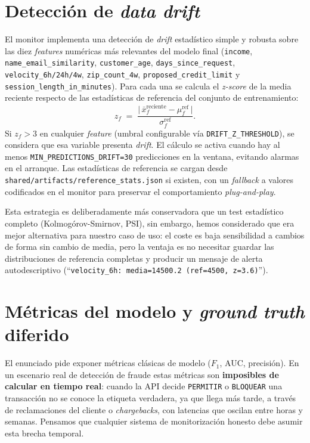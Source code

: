 \documentclass[12pt,a4paper]{report}
\begin{document}
\section{Detección de \textit{data drift}}
\label{sec:hito5-drift}

El monitor implementa una detección de \textit{drift} estadístico simple y robusta sobre las diez \textit{features} numéricas más relevantes del modelo final (\texttt{income}, \texttt{name\_email\_similarity}, \texttt{customer\_age}, \texttt{days\_since\_request}, \texttt{velocity\_6h/24h/4w}, \texttt{zip\_count\_4w}, \texttt{proposed\_credit\_limit} y \texttt{session\_length\_in\_minutes}). Para cada una se calcula el \textit{z-score} de la media reciente respecto de las estadísticas de referencia del conjunto de entrenamiento:
\[
z_f \;=\; \frac{\bigl|\,\bar{x}_f^{\text{reciente}} - \mu_f^{\text{ref}}\,\bigr|}{\sigma_f^{\text{ref}}}.
\]
Si $z_f > 3$ en cualquier \textit{feature} (umbral configurable vía \texttt{DRIFT\_Z\_THRESHOLD}), se considera que esa variable presenta \textit{drift}. El cálculo se activa cuando hay al menos \texttt{MIN\_PREDICTIONS\_DRIFT=30} predicciones en la ventana, evitando alarmas en el arranque. Las estadísticas de referencia se cargan desde \texttt{shared/artifacts/reference\_stats.json} si existen, con un \textit{fallback} a valores codificados en el monitor para preservar el comportamiento \textit{plug-and-play}.

Esta estrategia es deliberadamente más conservadora que un test estadístico completo (Kolmogórov-Smirnov, PSI), sin embargo, hemos considerado que era mejor alternativa para nuestro caso de uso: el coste es baja sensibilidad a cambios de forma sin cambio de media, pero la ventaja es no necesitar guardar las distribuciones de referencia completas y producir un mensaje de alerta autodescriptivo (``\texttt{velocity\_6h: media=14500.2 (ref=4500, z=3.6)}'').

\section{Métricas del modelo y \textit{ground truth} diferido}
\label{sec:hito5-modelo}

El enunciado pide exponer métricas clásicas de modelo ($F_1$, AUC, precisión). En un escenario real de detección de fraude estas métricas son \textbf{imposibles de calcular en tiempo real}: cuando la API decide \texttt{PERMITIR} o \texttt{BLOQUEAR} una transacción no se conoce la etiqueta verdadera, ya que llega más tarde, a través de reclamaciones del cliente o \textit{chargebacks}, con latencias que oscilan entre horas y semanas. Pensamos que cualquier sistema de monitorización honesto debe asumir esta brecha temporal.
\end{document}
